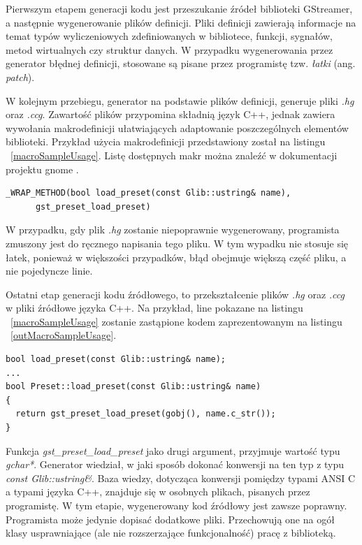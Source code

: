 \documentclass[12pt]{article}
\begin{document}
Pierwszym etapem generacji kodu jest przeszukanie źródeł biblioteki GStreamer, a następnie wygenerowanie plików definicji. Pliki definicji zawierają informacje na temat typów wyliczeniowych zdefiniowanych w bibliotece, funkcji, sygnałów, metod wirtualnych czy struktur danych. W przypadku wygenerowania przez generator błędnej definicji, stosowane są pisane przez programistę tzw. \textit{łatki} (ang. \textit{patch}).

W kolejnym przebiegu, generator na podstawie plików definicji, generuje pliki \textit{.hg} oraz \textit{.ccg}. Zawartość plików przypomina składnią język C++, jednak zawiera wywołania makrodefinicji ułatwiających adaptowanie poszczególnych elementów biblioteki. Przykład użycia makrodefinicji przedstawiony został na listingu ~\ref{macroSampleUsage}.
Listę dostępnych makr można znaleźć w dokumentacji projektu gnome \cite{devgnomepage}.
    \begin{lstlisting}[caption=Przykład użycia makrodefinicji w pliku \textit{.hg}, label=macroSampleUsage]
_WRAP_METHOD(bool load_preset(const Glib::ustring& name), 
      gst_preset_load_preset)
    \end{lstlisting}
    W przypadku, gdy plik \textit{.hg} zostanie niepoprawnie wygenerowany, programista zmuszony jest do ręcznego napisania tego pliku. W tym wypadku nie stosuje się łatek, ponieważ w większości przypadków, błąd obejmuje większą część pliku, a nie pojedyncze linie.

Ostatni etap generacji kodu źródłowego, to przekształcenie plików \textit{.hg} oraz \textit{.ccg} \\w pliki źródłowe języka C++. Na przykład, line pokazane na listingu ~\ref{macroSampleUsage} zostanie zastąpione kodem zaprezentowanym na listingu ~\ref{outMacroSampleUsage}.
    \begin{lstlisting}[caption=Kod źródłowy wygenerowany na podstawie makrodefinicji, label=outMacroSampleUsage]
bool load_preset(const Glib::ustring& name);
...
bool Preset::load_preset(const Glib::ustring& name)
{
  return gst_preset_load_preset(gobj(), name.c_str());
}
    \end{lstlisting}
    Funkcja \textit{gst\_preset\_load\_preset} jako drugi argument, przyjmuje wartość typu \textit{gchar*}. Generator wiedział, w jaki sposób dokonać konwersji na ten typ z typu \textit{const Glib::ustring\&}. Baza wiedzy, dotycząca konwersji pomiędzy typami ANSI C a typami języka C++, znajduje się w osobnych plikach, pisanych przez programistę.
W tym etapie, wygenerowany kod źródłowy jest zawsze poprawny. Programista może jedynie dopisać dodatkowe pliki. Przechowują one na ogół klasy usprawniające (ale nie rozszerzające funkcjonalność) pracę z biblioteką.
\cleardoublepage
\end{document}
